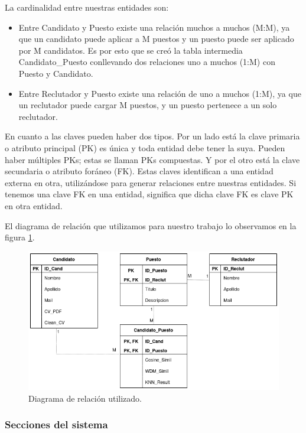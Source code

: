 \documentclass[12pt,a4paper]{article}
\begin{document}
\begin{sloppypar}
La cardinalidad entre nuestras entidades son:
\begin{itemize}
\item Entre Candidato y Puesto existe una relación muchos a muchos (M:M), ya que un candidato puede aplicar a M puestos y un puesto puede ser aplicado por M candidatos. Es por esto que se creó la tabla intermedia Candidato\_Puesto conllevando dos relaciones uno a muchos (1:M) con Puesto y Candidato.
\item Entre Reclutador y Puesto existe una relación de uno a muchos (1:M), ya que un reclutador puede cargar M puestos, y un puesto pertenece a un solo reclutador.
\end{itemize}

En cuanto a las claves pueden haber dos tipos. Por un lado está la clave primaria o atributo principal (PK)  es única y toda entidad debe tener la suya. Pueden haber múltiples PKs; estas se llaman PKs compuestas. Y por el otro está la clave secundaria o atributo foráneo (FK). Estas claves identifican a una entidad externa en otra, utilizándose para generar relaciones entre nuestras entidades. Si tenemos una clave FK en una entidad, significa que dicha clave FK es clave PK en otra entidad.


El diagrama de relación que utilizamos para nuestro trabajo lo observamos en la figura \ref{fig:Entity_Relation}.

\begin{figure}[H]    %
  \centering
  \includegraphics[width=1\textwidth]{images/BD_Entity_Relation.png}
  \caption{Diagrama de relación utilizado.}  
  \label{fig:Entity_Relation}
\end{figure}

\cleardoublepage

\subsubsection{Secciones del sistema}


\end{sloppypar}
\end{document}
